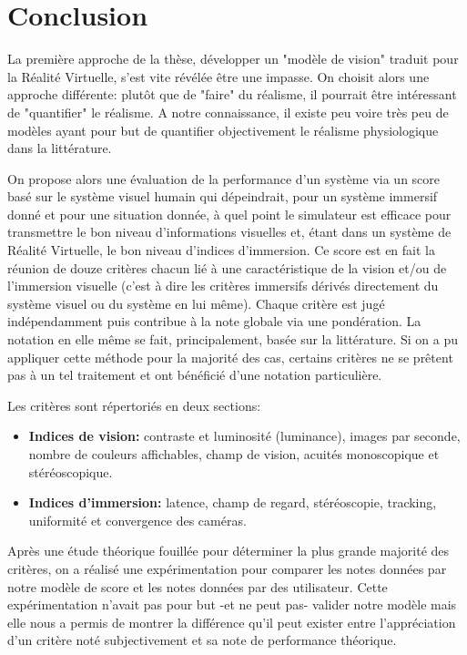 \chapter*{Conclusion}

\par La première approche de la thèse, développer un "modèle de vision" traduit pour la Réalité Virtuelle, s'est vite révélée être une impasse. On choisit alors une approche différente: plutôt que de "faire" du réalisme, il pourrait être intéressant de "quantifier" le réalisme. A notre connaissance, il existe peu voire très peu de modèles ayant pour but de quantifier objectivement le réalisme physiologique dans la littérature.

\par On propose alors une évaluation de la performance d'un système via un score basé sur le système visuel humain qui dépeindrait, pour un système immersif donné et pour une situation donnée, à quel point le simulateur est efficace pour transmettre le bon niveau d'informations visuelles et, étant dans un système de Réalité Virtuelle, le bon niveau d'indices d'immersion. Ce score est en fait la réunion de douze critères chacun lié à une caractéristique de la vision et/ou de l'immersion visuelle (c'est à dire les critères immersifs dérivés directement du système visuel ou du système en lui même). Chaque critère est jugé indépendamment puis contribue à la note globale via une pondération. La notation en elle même se fait, principalement, basée sur la littérature. Si on a pu appliquer cette méthode pour la majorité des cas, certains critères ne se prêtent pas à un tel traitement et ont bénéficié d'une notation particulière.

\par Les critères sont répertoriés en deux sections:
	
\begin{itemize}\itemsep12pt
	\item \textbf{Indices de vision:} contraste et luminosité (luminance), images par seconde, nombre de couleurs affichables, champ de vision, acuités monoscopique et stéréoscopique.
	\item \textbf{Indices d'immersion:} latence, champ de regard, stéréoscopie, tracking, uniformité et convergence des caméras.
\end{itemize}
	
\par Après une étude théorique fouillée pour déterminer la plus grande majorité des critères, on a réalisé une expérimentation pour comparer les notes données par notre modèle de score et les notes données par des utilisateur. Cette expérimentation n'avait pas pour but -et ne peut pas- valider notre modèle mais elle nous a permis de montrer la différence qu'il peut exister entre l'appréciation d'un critère noté subjectivement et sa note de performance théorique.

